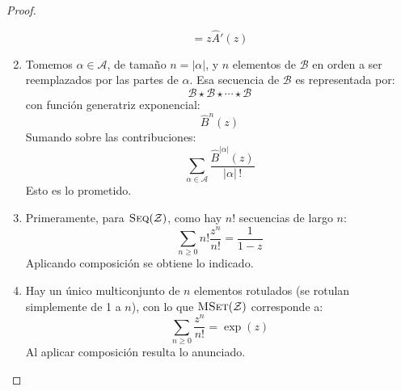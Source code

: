 \begin{proof}
\begin{enumerate}
\begin{equation*}
	  = z \widehat{A}'(z)
      \end{equation*}
    \item %
      Tomemos \(\alpha \in \mathcal{A}\),
      de tamaño \(n = \lvert \alpha \rvert\),
      y \(n\) elementos de \(\mathcal{B}\) en orden
      a ser reemplazados por las partes de \(\alpha\).
      Esa secuencia de \(\mathcal{B}\) es representada por:
      \begin{equation*}
	\mathcal{B}
	  \star \mathcal{B}
	  \star \dotsb
	  \star \mathcal{B}
      \end{equation*}
      con función generatriz exponencial:
      \begin{equation*}
	\widehat{B}^n (z)
      \end{equation*}
      Sumando sobre las contribuciones:
      \begin{equation*}
	\sum_{\alpha \in \mathcal{A}}
	   \frac{\widehat{B}^{\lvert \alpha \rvert}(z)}
		{\lvert \alpha \rvert \, !}
      \end{equation*}
      Esto es lo prometido.
    \item %
      Primeramente,
      para \(\operatorname{\textsc{Seq}}(\mathcal{Z})\),
      como hay \(n!\) secuencias de largo \(n\):
      \begin{equation*}
	\sum_{n \ge 0} n! \frac{z^n}{n!}
	  = \frac{1}{1 - z}
      \end{equation*}
      Aplicando composición se obtiene lo indicado.
    \item %
      Hay un único multiconjunto de \(n\) elementos rotulados
      (se rotulan simplemente de 1 a  \(n\)),
      con lo que \(\operatorname{\textsc{MSet}}(\mathcal{Z})\) corresponde a:
      \begin{equation*}
	\sum_{n \ge 0} \frac{z^n}{n!}
	  = \exp(z)
      \end{equation*}
      Al aplicar composición resulta lo anunciado.


\end{enumerate}
\end{proof}
